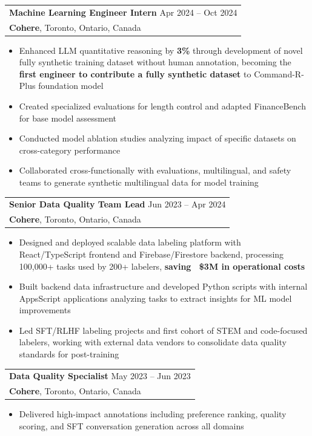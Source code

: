 \documentclass[letterpaper,10pt]{article}
\makeatletter
\newenvironment{resumeitemize}{
  \begin{itemize}[leftmargin=0.5in, itemsep=-1pt, topsep=1pt, labelsep=0.035in]
}{
  \end{itemize}
}
\newcommand{\experience}[4]{
  \begin{tabular}[t]{@{}p{6.5in}@{}}
    {\large\bfseries #1} \hfill {\small #2} \\
    {\bfseries #3}, #4
  \end{tabular}
}
\newcommand{\sectionspace}{\vspace{2pt}}
\makeatother
\begin{document}
\hspace{0.15in} \experience{Machine Learning Engineer Intern}{Apr 2024 -- Oct 2024}{Cohere}{Toronto, Ontario, Canada}
\begin{resumeitemize}
\item Enhanced LLM quantitative reasoning by \textbf{3\%} through development of novel fully synthetic training dataset without human annotation, becoming the \textbf{first engineer to contribute a fully synthetic dataset} to Command-R-Plus foundation model
\item Created specialized evaluations for length control and adapted FinanceBench for base model assessment
\item Conducted model ablation studies analyzing impact of specific datasets on cross-category performance
\item Collaborated cross-functionally with evaluations, multilingual, and safety teams to generate synthetic multilingual data for model training
\end{resumeitemize}
\sectionspace

\hspace{0.15in} \experience{Senior Data Quality Team Lead}{Jun 2023 -- Apr 2024}{Cohere}{Toronto, Ontario, Canada}
\begin{resumeitemize}
\item Designed and deployed scalable data labeling platform with React/TypeScript frontend and Firebase/Firestore backend, processing 100,000+ tasks used by 200+ labelers, \textbf{saving ~\$3M in operational costs}
\item Built backend data infrastructure and developed Python scripts with internal AppsScript applications analyzing tasks to extract insights for ML model improvements
\item Led SFT/RLHF labeling projects and first cohort of STEM and code-focused labelers, working with external data vendors to consolidate data quality standards for post-training
\end{resumeitemize}
\sectionspace

\hspace{0.15in} \experience{Data Quality Specialist}{May 2023 -- Jun 2023}{Cohere}{Toronto, Ontario, Canada}
\begin{resumeitemize}
\item Delivered high-impact annotations including preference ranking, quality scoring, and SFT conversation generation across all domains
\end{resumeitemize}
\sectionspace
\end{document}
